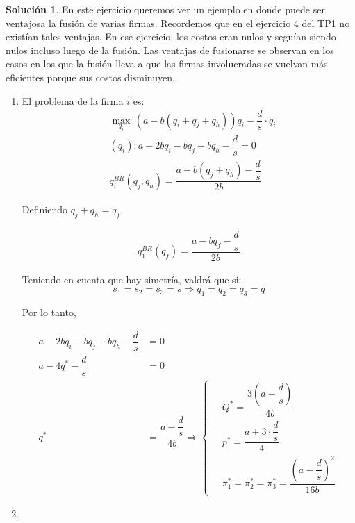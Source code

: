 \documentclass[a4paper, 11pt]{article}
\theoremstyle{definition}
\newtheorem{solucion}{Soluci\'on}
\begin{document}
\begin{solucion} %
En este ejercicio queremos ver un ejemplo en donde puede ser ventajosa la fusión de varias firmas. Recordemos que en el ejercicio 4 del TP1 no existían tales ventajas. En ese ejercicio, los costos eran nulos y seguían siendo nulos incluso luego de la fusión. Las ventajas de fusionarse se observan en los casos en los que la fusión lleva a que las firmas involucradas se vuelvan más eficientes porque sus costos disminuyen.

\begin{enumerate}
\item El problema de la firma $i$ es:
\vspace*{-18pt}
\begin{align*}
&\displaystyle\max_{q_i}\,(a-b(q_i+q_j+q_h))q_i-\dfrac{d}{s}\cdot q_i \\
&(q_i):a-2bq_i-bq_j-bq_h-\dfrac{d}{s}=0\\
&q_i^{BR}(q_j , q_h)= \dfrac{a-b(q_j+q_h)-\dfrac{d}{s}}{2b}
\end{align*}

Definiendo $q_j+q_h=q_f$,

\vspace*{-32pt}
 
\begin{align*}
q_1^{BR}(q_f)=\dfrac{a-bq_f-\dfrac{d}{s}}{2b}
\end{align*}

Teniendo en cuenta que hay simetría, valdrá que si:
\[s_1=s_2=s_3=s \Longrightarrow q_1=q_2=q_3=q\] 

\vspace*{-12pt}

Por lo tanto,

\vspace*{-24pt}

\begin{align*}
a-2bq_i-bq_j-bq_h-\dfrac{d}{s}&=0\\
a-4q^*-\dfrac{d}{s}&=0\\
q^*&=\dfrac{a-\dfrac{d}{s}}{4b}
\Longrightarrow \begin{cases} \quad Q^*=\dfrac{3\left(a-\dfrac{d}{s}\right)}{4b}\\
\quad p^*=\dfrac{a+3\cdot \dfrac{d}{s}}{4} 
\\ \quad\pi_1^*=\pi_2^*=\pi_3^*=\dfrac{\left(a-\dfrac{d}{s}\right)^2}{16b} \end{cases}
\end{align*}

\item


\end{enumerate}
\end{solucion}
\end{document}
